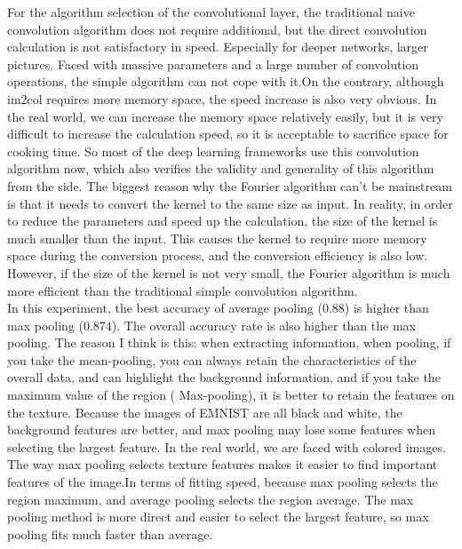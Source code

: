 \documentclass{article}
\begin{document}
For the algorithm selection of the convolutional layer, the traditional naive convolution algorithm does not require additional, but the direct convolution calculation is not satisfactory in speed. Especially for deeper networks, larger pictures. Faced with massive parameters and a large number of convolution operations, the simple algorithm can not cope with it.On the contrary, although im2col requires more memory space, the speed increase is also very obvious. In the real world, we can increase the memory space relatively easily, but it is very difficult to increase the calculation speed, so it is acceptable to sacrifice space for cooking time. So most of the deep learning frameworks use this convolution algorithm now, which also verifies the validity and generality of this algorithm from the side.
The biggest reason why the Fourier algorithm can't be mainstream is that it needs to convert the kernel to the same size as input. In reality, in order to reduce the parameters and speed up the calculation, the size of the kernel is much smaller than the input. This causes the kernel to require more memory space during the conversion process, and the conversion efficiency is also low. However, if the size of the kernel is not very small, the Fourier algorithm is much more efficient than the traditional simple convolution algorithm\cite{deeplearning2016}.\\
In this experiment, the best accuracy of average pooling (0.88) is higher than max pooling (0.874). The overall accuracy rate is also higher than the max pooling. The reason I think is this: when extracting information, when pooling, if you take the mean-pooling, you can always retain the characteristics of the overall data, and can highlight the background information, and if you take the maximum value of the region ( Max-pooling), it is better to retain the features on the texture\cite{BoureauY-Lan2010Lmff}. Because the images of EMNIST are all black and white, the background features are better, and max pooling may lose some features when selecting the largest feature. In the real world, we are faced with colored images. The way max pooling selects texture features makes it easier to find important features of the image.In terms of fitting speed, because max pooling selects the region maximum, and average pooling selects the region average. The max pooling method is more direct and easier to select the largest feature, so max pooling fits much faster than average.\\
\end{document}
